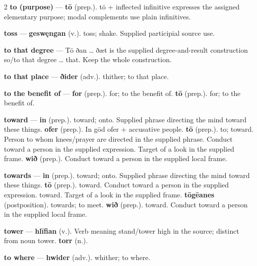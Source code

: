 \begin{multicols}{2}
\textbf{to (purpose)} — \textbf{tō} (prep.). tō + inflected infinitive expresses the assigned elementary purpose; modal complements use plain infinitives.\par
\textbf{toss} — \textbf{geswęngan} (v.). toss; shake. Supplied participial source use.\par
\textbf{to that degree} — Tō ðan … ðæt is the supplied degree-and-result construction so/to that degree … that. Keep the whole construction.\par
\textbf{to that place} — \textbf{ðider} (adv.). thither; to that place.\par
\textbf{to the benefit of} — \textbf{for} (prep.). for; to the benefit of. \textbf{tō} (prep.). for; to the benefit of.\par
\textbf{toward} — \textbf{in} (prep.). toward; onto. Supplied phrase directing the mind toward these things. \textbf{ofer} (prep.). In gōd ofer + accusative people. \textbf{tō} (prep.). to; toward. Person to whom knees/prayer are directed in the supplied phrase. Conduct toward a person in the supplied expression. Target of a look in the supplied frame. \textbf{wið} (prep.). Conduct toward a person in the supplied local frame.\par
\textbf{towards} — \textbf{in} (prep.). toward; onto. Supplied phrase directing the mind toward these things. \textbf{tō} (prep.). toward. Conduct toward a person in the supplied expression. toward. Target of a look in the supplied frame. \textbf{tōgēanes} (postposition). towards; to meet. \textbf{wið} (prep.). toward. Conduct toward a person in the supplied local frame.\par
\textbf{tower} — \textbf{hlīfian} (v.). Verb meaning stand/tower high in the source; distinct from noun tower. \textbf{torr} (n.).\par
\textbf{to where} — \textbf{hwider} (adv.). whither; to where.\par

\end{multicols}
